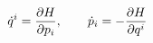 \documentclass[preview]{standalone}
\begin{document}
\begin{align*}
\special{dvisvgm:raw <g id='unique000'>}\dot q^i = \frac{\partial H}{\partial p_i},\qquad \dot p_i = -\frac{\partial H}{\partial q^i}\special{dvisvgm:raw </g>}
\end{align*}
\end{document}
